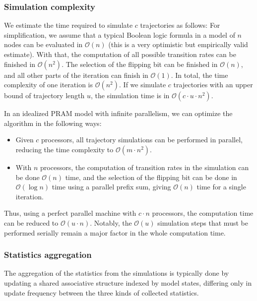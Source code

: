 \documentclass[a4paper,num-refs]{oup-contemporary}
\begin{document}
\subsubsection{Simulation complexity}

We estimate the time required to simulate $c$ trajectories as follows:
For simplification, we assume that a typical Boolean logic formula in a model of $n$ nodes can be evaluated in $\mathcal{O}(n)$ (this is a very optimistic but empirically valid estimate). With that, the computation of all possible transition rates can be finished in $\mathcal{O}(n^2)$. The selection of the flipping bit can be finished in $\mathcal{O}(n)$, and all other parts of the iteration can finish in $\mathcal{O}(1)$. In total, the time complexity of one iteration is $\mathcal{O}(n^2)$. If we simulate $c$ trajectories with an upper bound of trajectory length $u$, the simulation time is in $\mathcal{O}(c \cdot u \cdot n^2)$.

In an idealized PRAM model with infinite parallelism, we can optimize the algorithm in the following ways:
\begin{itemize}
    \item Given $c$ processors, all trajectory simulations can be performed in parallel, reducing the time complexity to $\mathcal{O}(m \cdot n^2)$.
    \item With $n$ processors, the computation of transition rates in the simulation can be done $\mathcal{O}(n)$ time, and the selection of the flipping bit can be done in $\mathcal{O}(\log{n})$ time using a parallel prefix sum, giving $\mathcal{O}(n)$ time for a single iteration.
\end{itemize}
Thus, using a perfect parallel machine with $c \cdot n$ processors, the computation time can be reduced to $\mathcal{O}(u \cdot n)$. Notably, the $\mathcal{O}(u)$ simulation steps that must be performed serially remain a major factor in the whole computation time.

\subsubsection{Statistics aggregation}

The aggregation of the statistics from the simulations is typically done by updating a shared associative structure indexed by model states, differing only in update frequency between the three kinds of collected statistics.
\end{document}
